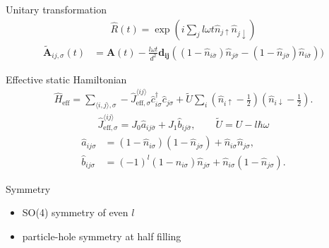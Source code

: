 \documentclass[]{beamer}
\begin{document}
\begin{frame} %
\pause
\footnotesize
\begin{block}{Unitary transformation}
\vspace{-3ex}
\begin{align*}
    \hat{R}(t)=\exp(i\sum_{j}l\omega t\hat{n}_{j\uparrow}\hat{n}_{j\downarrow})
\end{align*}
\vspace{-5ex}
\begin{align*}
    \tilde{\mathbf{A}}_{ij,\sigma}(t)&=\mathbf{A}(t)
        -\frac{l\omega t}{d^2} \mathbf{d_{ij}}
        ((1-\hat n_{i\bar\sigma})\hat n_{j\bar\sigma}
         -(1-\hat n_{j\bar\sigma})\hat n_{i\bar\sigma}))
\end{align*}
\end{block}
\pause
\begin{block}{Effective static Hamiltonian}
\begin{align*}
    \hat{H}_{\text{eff}} = \sum_{\langle i,j\rangle, \sigma} 
        -\hat{J}^{\langle ij\rangle}_{\text{eff},\sigma}
        \hat{c}_{i\sigma}^{\dagger}\hat{c}_{j\sigma} 
    + \tilde{U}\sum_{i}\left(\hat{n}_{i\uparrow}-\frac{1}{2}\right)
        \left(\hat{n}_{i\downarrow}-\frac{1}{2}\right).  %
\end{align*}
\vspace{-3ex}
\begin{align*}
    \hat{J}^{\langle ij\rangle}_{\text{eff},\sigma}=
        J_0\hat{a}_{ij\bar{\sigma}}+J_1\hat{b}_{ij\bar{\sigma}} , 
    \qquad
    \tilde{U} = U - l\hbar\omega
\end{align*}
\vspace{-3ex}
\begin{align*}
    \hat{a}_{ij\sigma} &= (1-\hat{n}_{i\sigma})(1-\hat{n}_{j\sigma}) 
        + \hat{n}_{i\sigma}\hat{n}_{j\sigma},\\
	\hat{b}_{ij\sigma} &= (-1)^l(1-\hat{n}_{i\sigma})\hat{n}_{j\sigma} 
        + \hat{n}_{i\sigma}(1-\hat{n}_{j\sigma}).
\end{align*}
\end{block}
\pause
\begin{block}{Symmetry}
\begin{itemize}
    \item SO(4) symmetry of even $l$
    \item particle-hole symmetry at half filling
\end{itemize}
\end{block}
\end{frame}
\end{document}
